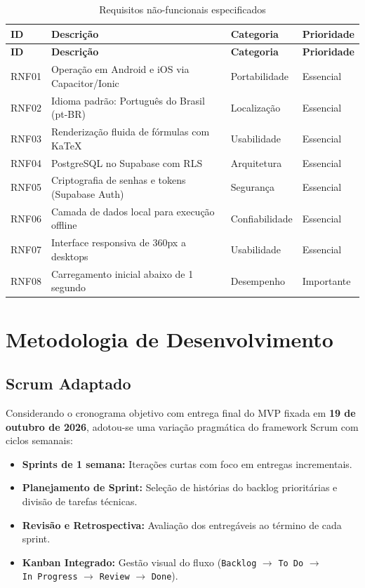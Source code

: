 \documentclass[12pt, a4paper]{article}
\begin{document}
\begin{longtable}{l p{7cm} l l}
\caption{Requisitos n\~{a}o-funcionais especificados} \\
\toprule
\textbf{ID} & \textbf{Descri\c{c}\~{a}o} & \textbf{Categoria} & \textbf{Prioridade} \\
\midrule
\endfirsthead
\toprule
\textbf{ID} & \textbf{Descri\c{c}\~{a}o} & \textbf{Categoria} & \textbf{Prioridade} \\
\midrule
\endhead
RNF01 & Opera\c{c}\~{a}o em Android e iOS via Capacitor/Ionic & Portabilidade & Essencial \\
RNF02 & Idioma padr\~{a}o: Portugu\^{e}s do Brasil (pt-BR) & Localiza\c{c}\~{a}o & Essencial \\
RNF03 & Renderiza\c{c}\~{a}o fluida de f\'{o}rmulas com KaTeX & Usabilidade & Essencial \\
RNF04 & PostgreSQL no Supabase com RLS & Arquitetura & Essencial \\
RNF05 & Criptografia de senhas e tokens (Supabase Auth) & Seguran\c{c}a & Essencial \\
RNF06 & Camada de dados local para execu\c{c}\~{a}o offline & Confiabilidade & Essencial \\
RNF07 & Interface responsiva de 360px a desktops & Usabilidade & Essencial \\
RNF08 & Carregamento inicial abaixo de 1 segundo & Desempenho & Importante \\
\bottomrule
\end{longtable}

\section{Metodologia de Desenvolvimento}

\subsection{Scrum Adaptado}

Considerando o cronograma objetivo com entrega final do MVP fixada em \textbf{19 de outubro de 2026}, adotou-se uma varia\c{c}\~{a}o pragm\'{a}tica do framework Scrum com ciclos semanais:

\begin{itemize}[leftmargin=2cm]
  \item \textbf{Sprints de 1 semana:} Itera\c{c}\~{o}es curtas com foco em entregas incrementais.
  \item \textbf{Planejamento de Sprint:} Sele\c{c}\~{a}o de hist\'{o}rias do backlog priorit\'{a}rias e divis\~{a}o de tarefas t\'{e}cnicas.
  \item \textbf{Revis\~{a}o e Retrospectiva:} Avalia\c{c}\~{a}o dos entreg\'{a}veis ao t\'{e}rmino de cada sprint.
  \item \textbf{Kanban Integrado:} Gest\~{a}o visual do fluxo (\texttt{Backlog} $\rightarrow$ \texttt{To~Do} $\rightarrow$ \texttt{In~Progress} $\rightarrow$ \texttt{Review} $\rightarrow$ \texttt{Done}).
\end{itemize}
\end{document}
